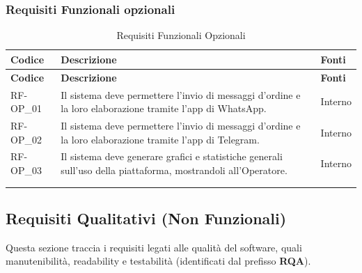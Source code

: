 \subsubsection{Requisiti Funzionali opzionali}
\renewcommand{\arraystretch}{1.15}
\begin{longtable}{|>{\raggedright}p{}|>{\raggedright\arraybackslash}p{}|>{\raggedright\arraybackslash}p{}|}
    \hline
    \rowcolor[gray]{0.9}
    \textbf{Codice} & \textbf{Descrizione} & \textbf{Fonti} \\
    \hline
    \endfirsthead
    \hline
    \rowcolor[gray]{0.9}
    \textbf{Codice} & \textbf{Descrizione} & \textbf{Fonti} \\
    \hline
    \endhead
    \hline
    RF-OP\_01 \hypertarget{rf-op_1} & Il sistema deve permettere l'invio di messaggi d'ordine e la loro elaborazione tramite l'app di WhatsApp. & Interno \\
    \hline
    RF-OP\_02 \hypertarget{rf-op_2} & Il sistema deve permettere l'invio di messaggi d'ordine e la loro elaborazione tramite l'app di Telegram. & Interno \\
    \hline
    RF-OP\_03 \hypertarget{rf-op_3} & Il sistema deve generare grafici e statistiche generali sull'uso della piattaforma, mostrandoli all'Operatore. & Interno \\
    \hline
    \multicolumn{3}{c}{} \\
    \caption{Requisiti Funzionali Opzionali}\hypertarget{tab:funzionali_opzionali}\\
\end{longtable}

\newpage
\subsection{Requisiti Qualitativi (Non Funzionali)}
Questa sezione traccia i requisiti legati alle qualità del software, quali manutenibilità, readability e testabilità (identificati dal prefisso \textbf{RQA}).

